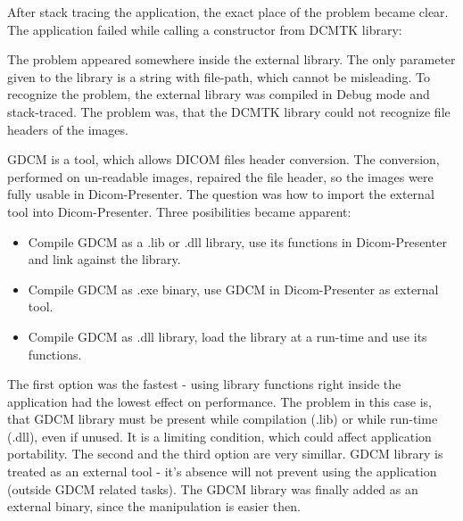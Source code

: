 After stack tracing the application, the exact place of the problem became clear. The application failed while calling a constructor from DCMTK library:


The problem appeared somewhere inside the external library. The only parameter given to the library is a string with file-path, which cannot be misleading. To recognize the problem, the external library was compiled in Debug mode and stack-traced. The problem was, that the DCMTK library could not recognize file headers of the images.

GDCM\cite{gdcm_home} is a tool, which allows DICOM files header conversion. The conversion, performed on un-readable images, repaired the file header, so the images were fully usable in Dicom-Presenter. The question was how to import the external tool into Dicom-Presenter. Three posibilities became apparent:

\begin{itemize}
\item Compile GDCM as a .lib or .dll library, use its functions in Dicom-Presenter and link against the library.
\item Compile GDCM as .exe binary, use GDCM in Dicom-Presenter as external tool.
\item Compile GDCM as .dll library, load the library at a run-time and use its functions.
\end{itemize}

The first option was the fastest - using library functions right inside the application had the lowest effect on performance. The problem in this case is, that GDCM library must be present while compilation (.lib) or while run-time (.dll), even if unused. It is a limiting condition, which could affect application portability. The second and the third option are very simillar. GDCM library is treated as an external tool - it's absence will not prevent using the application (outside GDCM related tasks). The GDCM library was finally added as an external binary, since the manipulation is easier then.

